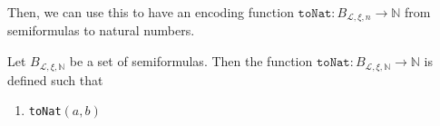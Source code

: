 Then, we can use this to have an encoding function $\texttt{toNat} : B_{\mathcal{L},\xi,n} \to \mathbb{N}$ from semiformulas to natural numbers.

\begin{definition}\label{def:toNat}
    \leanok
    Let $B_{\mathcal{L},\xi,\mathbb{N}}$ be a set of semiformulas. Then the function $\texttt{toNat} : B_{\mathcal{L},\xi,\mathbb{N}} \to \mathbb{N}$ is defined such that
    \begin{enumerate}
        \item \texttt{toNat}$(a,b)$

    \end{enumerate}

\end{definition}



